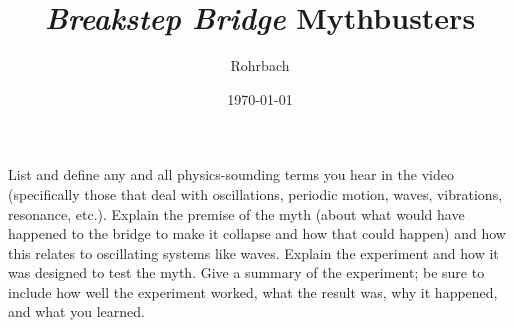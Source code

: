 \documentclass[10pt]{exam}
\title{\emph{Breakstep Bridge} Mythbusters}
\author{Rohrbach}
\date{\today}
\begin{document}
\maketitle

\begin{questions}
  \question
    List and define any and all physics-sounding terms you hear in the video (specifically those that deal with oscillations, periodic motion, waves, vibrations, resonance, etc.).  \vs
  \question
    Explain the premise of the myth (about what would have happened to the bridge to make it collapse and how that could happen) and how this relates to oscillating systems like waves.  \vs
  \question
    Explain the experiment and how it was designed to test the myth. \vs
  \question
    Give a summary of the experiment; be sure to include how well the experiment worked, what the result was, why it happened, and what you learned. \vs
\end{questions}
\end{document}
